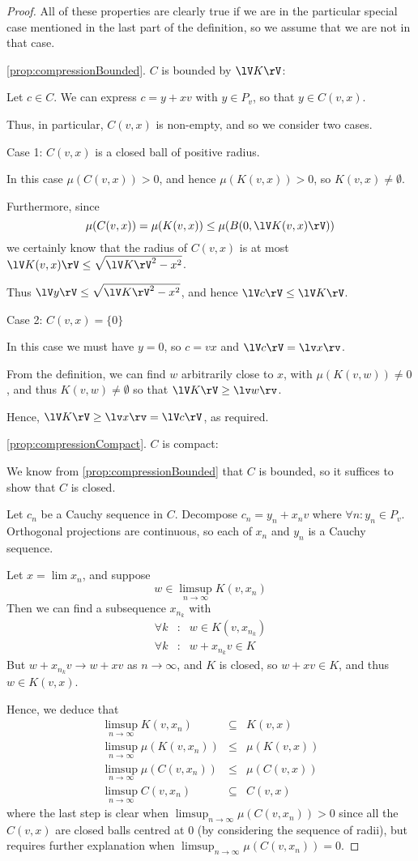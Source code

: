 \documentclass[a4paper,11pt]{article}
\begin{document}
\begin{proof}
All of these properties are clearly true if we are in the particular special
case mentioned in the last part of the definition, so we assume that we are not
in that case.

\ref{prop:compressionBounded}. $C$ is bounded by $\lV K\rV$:

Let $c\in C$.  We can express $c=y+xv$ with $y\in P_v$, so that $y\in C(v,x)$.

Thus, in particular, $C(v,x)$ is non-empty, and so we consider two cases.

Case 1: $C(v,x)$ is a closed ball of positive radius.

In this case
$\mu(C(v,x))>0$, and hence $\mu(K(v,x))>0$, so $K(v,x)\not=\emptyset$.

Furthermore, since
\[
\mu(C(v,x))=\mu(K(v,x))\leq\mu(B(0,\lV K(v,x)\rV))
\]
we certainly know that the radius
of $C(v,x)$ is at most $\lV K(v,x)\rV\leq\sqrt{\lV K\rV^2-x^2}$.

Thus $\lV y\rV\leq\sqrt{\lV K\rV^2-x^2}$, and hence $\lV c\rV\leq\lV K\rV$.

Case 2: $C(v,x)=\{0\}$

In this case we must have $y=0$, so $c=vx$ and $\lV c\rV=\lv x\rv$.

From the definition, we can find $w$
arbitrarily close to $x$, with $\mu(K(v,w))\not=0$, and thus
$K(v,w)\not=\emptyset$ so that $\lV K\rV\geq\lv w\rv$.

Hence, $\lV K\rV\geq\lv x\rv=\lV c\rV$, as required.

\ref{prop:compressionCompact}. $C$ is compact:

We know from \ref{prop:compressionBounded} that $C$ is bounded, so it suffices
to show that $C$ is closed.

Let $c_n$ be a Cauchy sequence in $C$.  Decompose $c_n=y_n+x_nv$ where
$\forall n:y_n\in P_v$.  Orthogonal projections are continuous, so each of
$x_n$ and $y_n$ is a Cauchy sequence.

Let $x=\lim x_n$, and suppose
\[
w\in\limsup_{n\to\infty}K(v,x_n)
\]
Then we can find a subsequence $x_{n_k}$ with
%
\begin{eqnarray*}
\forall k&:&w\in K(v,x_{n_k}) \\
\forall k&:&w+x_{n_k}v\in K
\end{eqnarray*}
%
But $w+x_{n_k}v\to w+xv$ as $n\to\infty$, and $K$ is closed, so $w+xv\in K$,
and thus $w\in K(v,x)$.

Hence, we deduce that
%
\begin{eqnarray*}
\limsup_{n\to\infty} K(v,x_n) &\subseteq& K(v,x) \\
\limsup_{n\to\infty}\mu(K(v,x_n)) &\leq& \mu(K(v,x)) \\
\limsup_{n\to\infty}\mu(C(v,x_n)) &\leq& \mu(C(v,x)) \\
\limsup_{n\to\infty}C(v,x_n) &\subseteq& C(v,x)
\end{eqnarray*}
%
where the last step is clear when $\limsup_{n\to\infty}\mu(C(v,x_n))>0$
since all the $C(v,x)$ are closed balls centred at $0$ (by considering the
sequence of radii),
but requires further explanation when $\limsup_{n\to\infty}\mu(C(v,x_n))=0$.


\end{proof}
\end{document}
